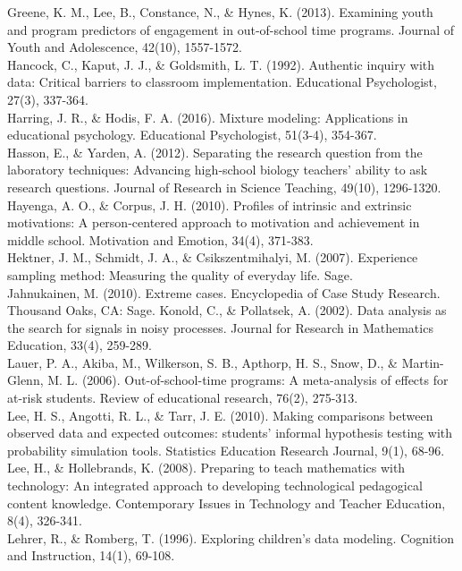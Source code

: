 \documentclass[]{book}
\theoremstyle{definition}
\theoremstyle{definition}
\theoremstyle{definition}
\theoremstyle{remark}
\begin{document}
Greene, K. M., Lee, B., Constance, N., \& Hynes, K. (2013). Examining
youth and program predictors of engagement in out-of-school time
programs. Journal of Youth and Adolescence, 42(10), 1557-1572.\\
Hancock, C., Kaput, J. J., \& Goldsmith, L. T. (1992). Authentic inquiry
with data: Critical barriers to classroom implementation. Educational
Psychologist, 27(3), 337-364.\\
Harring, J. R., \& Hodis, F. A. (2016). Mixture modeling: Applications
in educational psychology. Educational Psychologist, 51(3-4), 354-367.\\
Hasson, E., \& Yarden, A. (2012). Separating the research question from
the laboratory techniques: Advancing high‐school biology teachers'
ability to ask research questions. Journal of Research in Science
Teaching, 49(10), 1296-1320.\\
Hayenga, A. O., \& Corpus, J. H. (2010). Profiles of intrinsic and
extrinsic motivations: A person-centered approach to motivation and
achievement in middle school. Motivation and Emotion, 34(4), 371-383.\\
Hektner, J. M., Schmidt, J. A., \& Csikszentmihalyi, M. (2007).
Experience sampling method: Measuring the quality of everyday life.
Sage.\\
Jahnukainen, M. (2010). Extreme cases. Encyclopedia of Case Study
Research. Thousand Oaks, CA: Sage. Konold, C., \& Pollatsek, A. (2002).
Data analysis as the search for signals in noisy processes. Journal for
Research in Mathematics Education, 33(4), 259-289.\\
Lauer, P. A., Akiba, M., Wilkerson, S. B., Apthorp, H. S., Snow, D., \&
Martin-Glenn, M. L. (2006). Out-of-school-time programs: A meta-analysis
of effects for at-risk students. Review of educational research, 76(2),
275-313.\\
Lee, H. S., Angotti, R. L., \& Tarr, J. E. (2010). Making comparisons
between observed data and expected outcomes: students' informal
hypothesis testing with probability simulation tools. Statistics
Education Research Journal, 9(1), 68-96.\\
Lee, H., \& Hollebrands, K. (2008). Preparing to teach mathematics with
technology: An integrated approach to developing technological
pedagogical content knowledge. Contemporary Issues in Technology and
Teacher Education, 8(4), 326-341.\\
Lehrer, R., \& Romberg, T. (1996). Exploring children's data modeling.
Cognition and Instruction, 14(1), 69-108.\\
\end{document}
